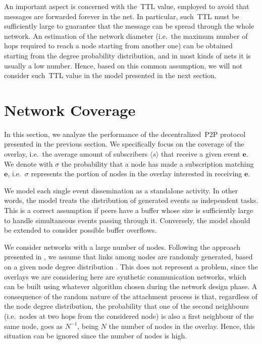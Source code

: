 \documentclass[10pt, conference, compsocconf]{IEEEtran}
\begin{document}
An important aspect is concerned with the~\ac{TTL} value, employed to avoid that messages are forwarded forever in the net. In particular, such~\ac{TTL} must be sufficiently large to guarantee that the message can be spread through the whole network.
An estimation of the network diameter (i.e.~the maximum number of hops required to reach a node starting from another one) can be obtained starting from the degree probability distribution, and in most kinds of nets it is usually a low number.
Hence, based on this common assumption, we will not consider such~\ac{TTL} value in the model presented in the next section. 

\section{Network Coverage}\label{sec:cn}

In this section, we analyze the performance of the decentralized~\ac{P2P} protocol presented in the previous section. We specifically focus on the coverage of the overlay, i.e.~the average amount of subscribers $\langle s \rangle$ that receive a given event $\mathbf{e}$. 
We denote with $\sigma$ the probability that a node has made a subscription matching $\mathbf{e}$, i.e.~$\sigma$ represents the portion of nodes in the overlay interested in receiving $\mathbf{e}$. 

We model each single event dissemination as a standalone activity. In other words, the model treats the distribution of generated events as independent tasks. This is a correct assumption if peers have a buffer whose size is sufficiently large to handle simultaneous events passing through it. Conversely, the model should be extended to consider possible buffer overflows. 

We consider networks with a large number of nodes. Following the approach presented in \cite{newman03thestructure,newmanHandbook}, we assume that links among nodes are randomly generated, based on a given node degree distribution \cite{BenderC78}. 
This does not represent a problem, since the overlays we are considering here are synthetic communication networks, which can be built using whatever algorithm chosen during the network design phase.
A consequence of the random nature of the attachment process is that, regardless of the node degree distribution, the probability that one of the second neighbours (i.e.~nodes at two hops from the considered node) is also a first neighbour of the same node, goes as $N^{-1}$, being $N$ the number of nodes in the overlay. Hence, this situation can be ignored since the number of nodes is high. 
\end{document}
